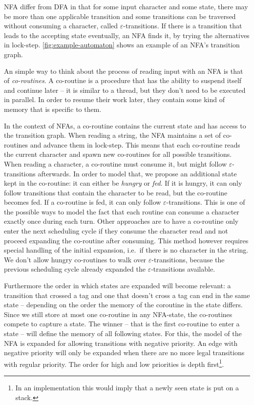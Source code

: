 \documentclass[11pt,a4paper,twoside,openright]{Thesis}
\theoremstyle{definition}
\begin{document}
NFA differ from DFA in that for some input character and some state, there
may be more than one applicable transition and some transitions can be
traversed without consuming a character, called $\varepsilon$-transitions.  If
there is a transition that leads to the accepting state eventually, an NFA
finds it, by trying the alternatives in lock-step.
\autoref{fig:example-automaton} shows an example of an NFA's transition graph.

An simple way to think about the process of reading input with an NFA is that
of \emph{co-routines}. A co-routine is a procedure that has the ability to
suspend itself and continue later -- it is similar to a thread, but they
don't need to be executed in parallel. In order to resume their work later,
they contain some kind of memory that is specific to them.

In the context of NFAs, a co-routine contains the current state and has access
to the transition graph. When reading a
string, the NFA maintains a set of co-routines and advance them in
lock-step. This means that each co-routine reads the current character and
spawn new co-routines for all possible transitions. When reading a character,
a co-routine must consume it, but might follow $\varepsilon$-transitions
afterwards. In order to model that, we propose an additional state kept in
the co-routine: it can either be \emph{hungry} or \emph{fed}. If it is
hungry, it can only follow transitions that contain the character to be read,
but the co-routine becomes fed. If a co-routine is fed, it can only
follow $\varepsilon$-transitions. This is one of the possible ways to model
the fact that each routine can consume a character exactly once during each
turn. Other approaches are to have a co-routine only enter the next scheduling
cycle if they consume the character read and not proceed expanding the
co-routine after consuming. This method however requires special handling of
the initial expansion, i.e.\ if there is no character in the string. We don't
allow hungry co-routines to walk over $\varepsilon$-transitions, because the
previous scheduling cycle already expanded the $\varepsilon$-transitions
available.

Furthermore the order in which states are expanded will become relevant: a
transition that crossed a tag and one that doesn't cross a tag can end in the
same state -- depending on the order the memory of the coroutine in the state
differs. Since we still store at most one co-routine in any NFA-state, the
co-routines compete to capture a state. The winner -- that is the first
co-routine to enter a state -- will define the memory of all following states.
For this, the model of the NFA is expanded for allowing transitions with
negative priority. An edge with negative priority will only be expanded when
there are no more legal transitions with regular priority. The order for high
and low priorities is depth first\footnote{In an implementation this would
  imply that a newly seen state is put on a stack.}.
\end{document}
